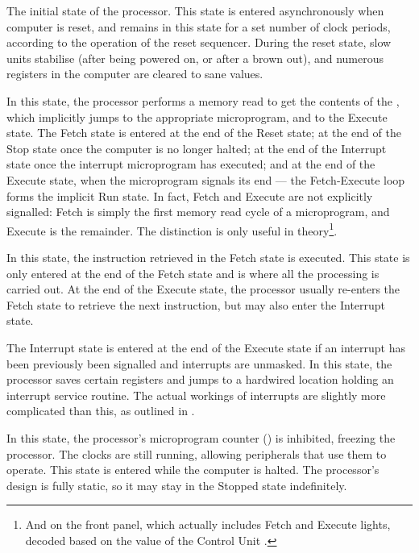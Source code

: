 \begin{description}
 The initial state of the processor. This state is
  entered asynchronously when computer is reset, and remains in this state for
  a set number of clock periods, according to the operation of the reset
  sequencer. During the reset state, slow units stabilise (after being powered
  on, or after a brown out), and numerous registers in the computer are cleared
  to sane values.

 In this state, the processor performs a memory read to
  get the contents of the \IR, which implicitly jumps to the appropriate
  microprogram, and to the Execute state. The Fetch state is entered at the end
  of the Reset state; at the end of the Stop state once the computer is no
  longer halted; at the end of the Interrupt state once the interrupt
  microprogram has executed; and at the end of the Execute state, when the
  microprogram signals its end — the Fetch-Execute loop forms the implicit Run
  state. In fact, Fetch and Execute are not explicitly signalled: Fetch is
  simply the first memory read cycle of a microprogram, and Execute is the
  remainder. The distinction is only useful in theory\footnote{And on the front
    panel, which actually includes Fetch and Execute lights, decoded based on
    the value of the Control Unit .}.

 In this state, the instruction retrieved in the
  Fetch state is executed. This state is only entered at the end of the Fetch
  state and is where all the processing is carried out. At the end of the
  Execute state, the processor usually re-enters the Fetch state to retrieve
  the next instruction, but may also enter the Interrupt state.

 The Interrupt state is entered at the end of the Execute state
if an interrupt has been previously been signalled and interrupts are
unmasked. In this state, the processor saves certain registers and jumps to a
hardwired location holding an interrupt service routine. The actual workings of
interrupts are slightly more complicated than this, as outlined in
.

 In this state, the processor's microprogram counter
  (\UPC) is inhibited, freezing the processor. The clocks are still
  running, allowing peripherals that use them to operate. This state is entered
  while the computer is halted. The processor's design is fully static, so it
  may stay in the Stopped state indefinitely.

\end{description}

